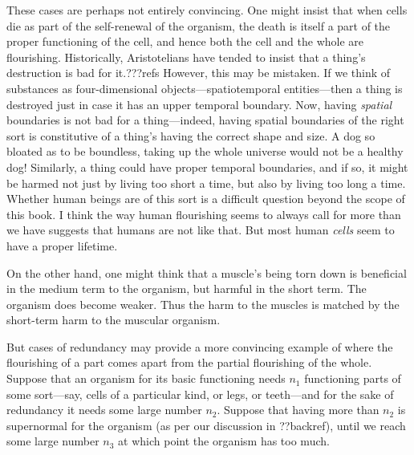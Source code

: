 These cases are perhaps not entirely convincing. One might insist that when cells die as part of the self-renewal
of the organism, the death is itself a part of the proper functioning of the cell, and hence both the cell and the
whole are flourishing. Historically, Aristotelians have tended to insist that a thing's destruction is bad
for it.???refs However, this may be mistaken. If we think of substances as four-dimensional objects---spatiotemporal
entities---then a thing is destroyed just in case it has an upper temporal boundary. Now, having \textit{spatial} 
boundaries is not bad for a thing---indeed, having spatial boundaries of the right sort is constitutive of a thing's
having the correct shape and size. A dog so bloated as to be boundless, taking up the whole universe would not be a 
healthy dog! Similarly, a thing could have proper temporal boundaries, and if so, it might be harmed not just by
living too short a time, but also by living too long a time. Whether human beings are of this sort is a difficult
question beyond the scope of this book. I think the way human flourishing seems to always call for more than we have
suggests that humans are not like that. But most human \textit{cells} seem to have a proper lifetime. 

On the other hand, one might think that a muscle's being torn down is beneficial in the medium term to the organism,
but harmful in the short term. The organism does become weaker. Thus the harm to the muscles is matched by the 
short-term harm to the muscular organism.

But cases of redundancy may provide a more convincing example of where the flourishing of a part comes apart from
the partial flourishing of the whole. Suppose that an organism for its basic functioning needs $n_1$ functioning parts of some sort---say,
cells of a particular kind, or legs, or teeth---and for the sake of redundancy it needs some large number $n_2$.
Suppose that having more than $n_2$ is supernormal for the organism (as per our discussion in ??backref), until we
reach some large number $n_3$ at which point the organism has too much.  

